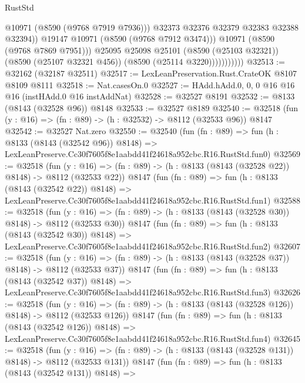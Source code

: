 \begin{lexlean}{RustStd}
\begin{coremodule}
                                @10971
                                (@8590 (@9768 @7919 @7936)))
                              @32373
                              @32376
                              @32379
                              @32383
                              @32388
                              @32394))
                          @19147
                          @10971
                          (@8590 (@9768 @7912 @3474)))
                        @10971
                        (@8590 (@9768 @7869 @7951)))
                      @25095
                      @25098
                      @25101
                      (@8590 (@25103 @32321))
                      (@8590 (@25107 @32321 @456))
                      (@8590 (@25114 @3220)))))))))))
@32513 := @32162 (@32187 @32511)
@32517 := LexLeanPreservation.Rust.CrateOK @8107 @8109 @8111
@32518 := Nat.casesOn.{0}
@32527 := HAdd.hAdd.{0, 0, 0} @16 @16 @16 (instHAdd.{0} @16 instAddNat)
@32528 := @32527 @8191
@32532 := @8133 (@8143 (@32528 @96)) @8148
@32533 := @32527 @8189
@32540 := @32518 (fun (y : @16) => (fn : @89) -> (h : @32532) -> @8112 (@32533 @96)) @8147
@32542 := @32527 Nat.zero
@32550 := @32540
    (fun (fn : @89) =>
    fun (h : @8133 (@8143 (@32542 @96)) @8148) =>
    LexLeanPreserve.Cc30f7605f8e1aabdd41f24618a952cbc.R16.RustStd.fun0)
@32569 := @32518
    (fun (y : @16) => (fn : @89) -> (h : @8133 (@8143 (@32528 @22)) @8148) -> @8112 (@32533 @22))
    @8147
    (fun (fn : @89) =>
    fun (h : @8133 (@8143 (@32542 @22)) @8148) =>
    LexLeanPreserve.Cc30f7605f8e1aabdd41f24618a952cbc.R16.RustStd.fun1)
@32588 := @32518
    (fun (y : @16) => (fn : @89) -> (h : @8133 (@8143 (@32528 @30)) @8148) -> @8112 (@32533 @30))
    @8147
    (fun (fn : @89) =>
    fun (h : @8133 (@8143 (@32542 @30)) @8148) =>
    LexLeanPreserve.Cc30f7605f8e1aabdd41f24618a952cbc.R16.RustStd.fun2)
@32607 := @32518
    (fun (y : @16) => (fn : @89) -> (h : @8133 (@8143 (@32528 @37)) @8148) -> @8112 (@32533 @37))
    @8147
    (fun (fn : @89) =>
    fun (h : @8133 (@8143 (@32542 @37)) @8148) =>
    LexLeanPreserve.Cc30f7605f8e1aabdd41f24618a952cbc.R16.RustStd.fun3)
@32626 := @32518
    (fun (y : @16) => (fn : @89) -> (h : @8133 (@8143 (@32528 @126)) @8148) -> @8112 (@32533 @126))
    @8147
    (fun (fn : @89) =>
    fun (h : @8133 (@8143 (@32542 @126)) @8148) =>
    LexLeanPreserve.Cc30f7605f8e1aabdd41f24618a952cbc.R16.RustStd.fun4)
@32645 := @32518
    (fun (y : @16) => (fn : @89) -> (h : @8133 (@8143 (@32528 @131)) @8148) -> @8112 (@32533 @131))
    @8147
    (fun (fn : @89) =>
    fun (h : @8133 (@8143 (@32542 @131)) @8148) =>

\end{coremodule}
\end{lexlean}
